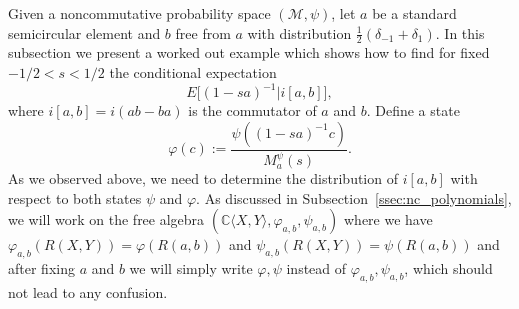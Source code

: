 \documentclass[12pt]{amsart}
\def\C{{\mathbb C}}
\def\E{E}
\newcommand{\alg}[1]{\mathcal{#1}}
\theoremstyle{definition}
\numberwithin{equation}{section}
\begin{document}
Given a noncommutative probability space $(\alg{M},\psi)$,
let $a$ be a standard semicircular element and
$b$ free from $a$ with distribution $\frac{1}{2}(\delta_{-1}+\delta_1)$.
In this subsection we present a worked out example which shows how to find for fixed $-1/2<s<1/2$ the conditional expectation
\[
  \E\bigl[(1-sa)^{-1} \big| i[a,b]\bigr],
\]
where $i[a,b] = i(ab - ba)$ is the commutator of $a$ and $b$. Define a state
\[\varphi(c):=\frac{\psi\left((1-sa)^{-1}c\right)}{M_a^{\psi}(s)}.\]
As we observed above, we need to determine the distribution of $i[a,b]$ with
respect to both states $\psi$ and $\varphi$.
As discussed in Subsection~\ref{ssec:nc_polynomials},
we will work on the free algebra $\left(\C\langle
  X,Y\rangle,\varphi_{a,b},\psi_{a,b} \right)$
where we have $\varphi_{a,b}(R(X,Y))=\varphi(R(a,b))$ and
$\psi_{a,b}(R(X,Y))=\psi(R(a,b))$
and after fixing $a$ and $b$ we will simply write $\varphi, \psi$
instead of $\varphi_{a,b},\psi_{a,b}$, which should not lead to any confusion.
\end{document}
